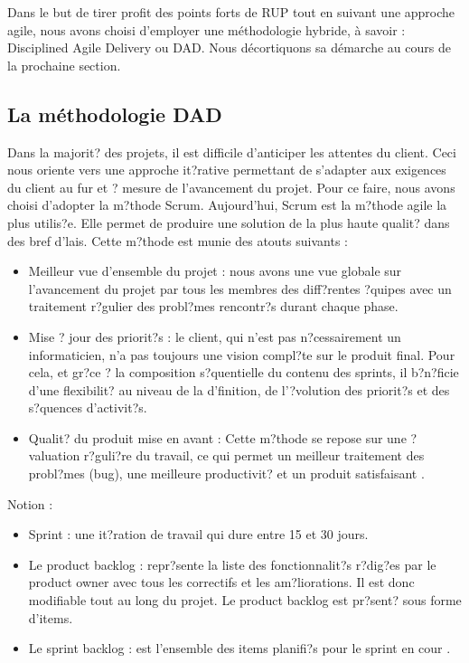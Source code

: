 \begin{spacing}{1.5}
\begin{table}[h]
\end{table}
Dans le but de tirer profit des points forts de RUP tout en suivant une approche agile, nous avons choisi d'employer une méthodologie hybride, à savoir : Disciplined Agile Delivery ou DAD. Nous décortiquons sa démarche au cours de la prochaine section.

\subsection{La méthodologie DAD}
Dans la majorit? des projets, il est difficile d'anticiper les attentes du client. Ceci nous oriente vers une approche it?rative permettant de s'adapter aux exigences du client au fur et ? mesure de l'avancement du projet. Pour ce faire, nous avons choisi d'adopter la m?thode Scrum.
Aujourd'hui, Scrum est la m?thode agile la plus utilis?e. Elle permet de produire une solution de la plus haute qualit? dans des bref d'lais.
Cette m?thode est munie des atouts suivants :
\begin{itemize}
  \item Meilleur vue d'ensemble du projet : nous avons une vue globale sur l'avancement du projet par tous les membres des diff?rentes ?quipes avec un traitement r?gulier des probl?mes rencontr?s durant chaque phase.
  \item Mise ? jour des priorit?s : le client, qui n'est pas n?cessairement un informaticien, n'a pas toujours une vision compl?te sur le produit final. Pour cela, et gr?ce ? la composition s?quentielle du contenu des sprints, il b?n?ficie d'une flexibilit? au niveau de la d'finition, de l'?volution des priorit?s et des s?quences d'activit?s.
  \item Qualit? du produit mise en avant : Cette m?thode se repose sur une ?valuation r?guli?re du travail, ce qui permet un meilleur traitement des probl?mes (bug), une meilleure productivit? et un produit satisfaisant \cite{AvantageScrum}.
\end{itemize}

Notion :
\begin{itemize}
  \item Sprint  : une it?ration de travail qui dure entre 15 et 30 jours.
  \item Le product backlog : repr?sente la liste des fonctionnalit?s r?dig?es par le product owner avec tous les correctifs et les am?liorations. Il est donc modifiable tout au long du projet. Le product backlog est pr?sent? sous forme d'items.
  \item Le sprint backlog : est l'ensemble des items planifi?s pour le sprint en cour \cite{SCRUM}.
\end{itemize}


\end{spacing}
